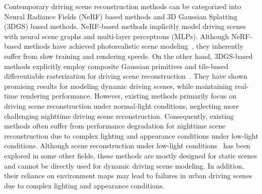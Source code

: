 \documentclass[letterpaper, 10 pt, conference]{ieeeconf}  %
\begin{document}
Contemporary driving scene reconstruction methods can be categorized into Neural Radiance Fields (NeRF) based methods and 3D Gaussian Splatting (3DGS) based methods.
NeRF-based methods implicitly model driving scenes with neural scene graphs and multi-layer perceptrons (MLPs).
Although NeRF-based methods have achieved photorealistic scene modeling~\cite{ost2021neural,cao2024lightning,yang2023unisim, yang2023emernerf}, they inherently suffer from slow training and rendering speeds.
On the other hand, 3DGS-based methods explicitly employ composite Gaussian primitives and tile-based differentiable rasterization for driving scene reconstruction~\cite{chen2025omnire,yan2024street,wu2025armgs,zhou2024drivinggaussian}.
They have shown promising results for modeling dynamic driving scenes, while maintaining real-time rendering performance.
However, existing methods primarily focus on driving scene reconstruction under normal-light conditions, neglecting more challenging nighttime driving scene reconstruction.
Consequently, existing methods often suffer from performance degradation for nighttime scene reconstruction due to complex lighting and appearance conditions under low-light conditions.
Although scene reconstruction under low-light conditions~\cite{qu2024lush,ye2024gaussian,gao2024relightable} has been explored in some other fields, these methods are mostly designed for static scenes and cannot be directly used for dynamic driving scene modeling.
In addition, their reliance on environment maps may lead to failures in urban driving scenes due to complex lighting and appearance conditions.
\end{document}

